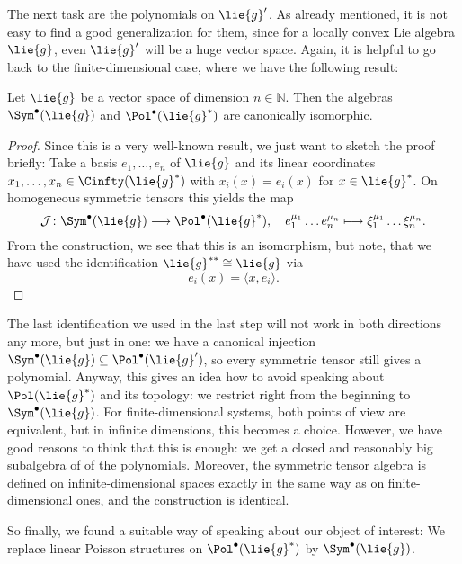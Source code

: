 The next task are the polynomials on $\lie{g}'$. As already mentioned, it 
is not easy to find a good generalization for them, since for a locally 
convex Lie algebra $\lie{g}$, even $\lie{g}'$ will be a huge vector space. 
Again, it is helpful to go back to the finite-dimensional case, where we 
have the following result:
\begin{proposition}
	\label{Alg:Prop:PolIsSym}
	Let $\lie{g}$ be a vector space of dimension $n \in \mathbb{N}$. Then 
	the algebras $\Sym^{\bullet}(\lie{g})$ and $\Pol^{\bullet}(\lie{g}^*)$ 
	are canonically isomorphic.
\end{proposition}
\begin{proof}
	Since this is a very well-known result, we just want to sketch the 
	proof briefly: Take a basis $e_1, \ldots, e_n$ of $\lie{g}$ and its 
	linear coordinates $x_1, \ldots, x_n \in \Cinfty(\lie{g}^*)$ with 
	$x_i(x) = e_i(x)$ for $x \in \lie{g}^*$. On homogeneous symmetric 
	tensors this yields the map
	\begin{equation*}
		\mathcal{J}
		\colon
		\Sym^{\bullet}(\lie{g})
		\longrightarrow
		\Pol^{\bullet}(\lie{g}^*),
		\quad
		e_1^{\mu_1} \ldots e_n^{\mu_n}
		\longmapsto
		\xi_1^{\mu_1} \ldots \xi_n^{\mu_n}.
	\end{equation*}
	From the construction, we see that this is an isomorphism, but note, 
	that we have used the identification $\lie{g}^{**} \cong \lie{g}$ via
	\begin{equation*}
		e_i(x)
		=
		\langle x, e_i \rangle.
	\end{equation*}
\end{proof}
The last identification we used in the last step will not work in both
directions any more, but just in one: we have a canonical injection
$\Sym^{\bullet}(\lie{g}) \subseteq \Pol^{\bullet}(\lie{g}')$, so every 
symmetric tensor still gives a polynomial. Anyway, this gives an idea 
how to avoid speaking about $\Pol(\lie{g}^*)$ and its topology: we 
restrict right from the beginning to $\Sym^{\bullet}(\lie{g})$.
For finite-dimensional systems, both points of view are equivalent,
but in infinite dimensions, this becomes a choice. However,
we have good reasons to think that this is enough: we get a closed 
and reasonably big subalgebra of of the polynomials. Moreover, 
the symmetric tensor algebra is defined on infinite-dimensional spaces 
exactly in the same way as on finite-dimensional ones,  and the 
construction is identical. 

So finally, we found a suitable way of speaking about our object of 
interest: We replace linear Poisson structures on $\Pol^{\bullet}
(\lie{g}^*)$ by $\Sym^{\bullet}(\lie{g})$. 




